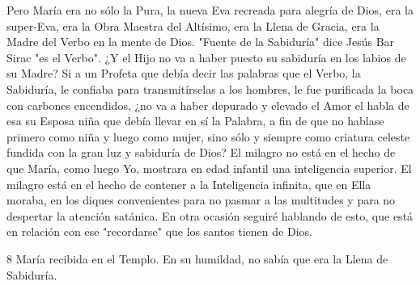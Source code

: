 \documentclass[12pt]{book} %
\begin{document}
Pero María era no sólo la Pura, la nueva Eva recreada para alegría de Dios, era la super-Eva, era la Obra Maestra del Altísimo, era la Llena de Gracia, era la Madre del Verbo en la mente de Dios. 
"Fuente de la Sabiduría" dice Jesús Bar Sirac "es el Verbo". ¿Y el Hijo no va a haber puesto su sabiduría en los labios de su Madre? 
Si a un Profeta que debía decir las palabras que el Verbo, la Sabiduría, le confiaba para transmitírselas a los hombres, le fue purificada la boca con carbones encendidos, ¿no va a haber depurado y elevado el Amor el habla de esa su Esposa niña que debía llevar en sí la Palabra, a fin de que no hablase primero como niña y luego como mujer, sino sólo y siempre como criatura celeste fundida con la gran luz y sabiduría de Dios? 
El milagro no está en el hecho de que María, como luego Yo, mostrara en edad infantil una inteligencia superior. El 
milagro está en el hecho de contener a la Inteligencia infinita, que en Ella moraba, en los diques convenientes para no pasmar a las multitudes y para no despertar la atención satánica. 
En otra ocasión seguiré hablando de esto, que está en relación con ese "recordarse" que los santos tienen de Dios. 
 
 
8 
María recibida en el Templo. En su humildad, no sabía que era la Llena de Sabiduría. 
 
 
 
\end{document}
